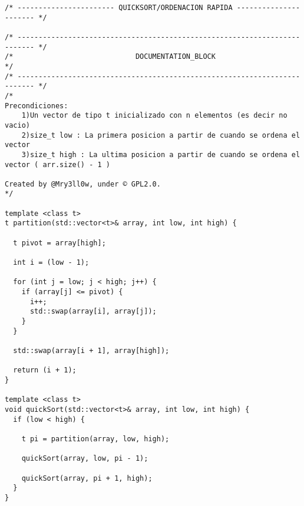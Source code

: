 \begin{lstlisting}
/* ----------------------- QUICKSORT/ORDENACION RAPIDA ---------------------- */

/* -------------------------------------------------------------------------- */
/*                             DOCUMENTATION_BLOCK                            */
/* -------------------------------------------------------------------------- */
/*
Precondiciones: 
    1)Un vector de tipo t inicializado con n elementos (es decir no vacio)
    2)size_t low : La primera posicion a partir de cuando se ordena el vector
    3)size_t high : La ultima posicion a partir de cuando se ordena el vector ( arr.size() - 1 )

Created by @Mry3ll0w, under © GPL2.0.
*/ 

template <class t>
t partition(std::vector<t>& array, int low, int high) {
    
  t pivot = array[high];
  
  int i = (low - 1);

  for (int j = low; j < high; j++) {
    if (array[j] <= pivot) {
      i++;  
      std::swap(array[i], array[j]);
    }
  }
  
  std::swap(array[i + 1], array[high]);
  
  return (i + 1);
}

template <class t>
void quickSort(std::vector<t>& array, int low, int high) {
  if (low < high) {
      
    t pi = partition(array, low, high);

    quickSort(array, low, pi - 1);

    quickSort(array, pi + 1, high);
  }
}  

\end{lstlisting}